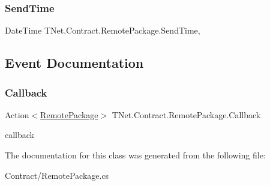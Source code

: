 \subsubsection{\texorpdfstring{Send\+Time}{SendTime}}
{\footnotesize\ttfamily Date\+Time T\+Net.\+Contract.\+Remote\+Package.\+Send\+Time\hspace{0.3cm}{\ttfamily [get]}, {\ttfamily [set]}}







\subsection{Event Documentation}
\mbox{\label{class_t_net_1_1_contract_1_1_remote_package_ae8be12f234dc53346fc1c90534c3c410}} 
\subsubsection{\texorpdfstring{Callback}{Callback}}
{\footnotesize\ttfamily Action$<$\mbox{\hyperlink{class_t_net_1_1_contract_1_1_remote_package}{Remote\+Package}}$>$ T\+Net.\+Contract.\+Remote\+Package.\+Callback}



callback 



The documentation for this class was generated from the following file\+:\begin{DoxyCompactItemize}
\item 
Contract/Remote\+Package.\+cs\end{DoxyCompactItemize}
